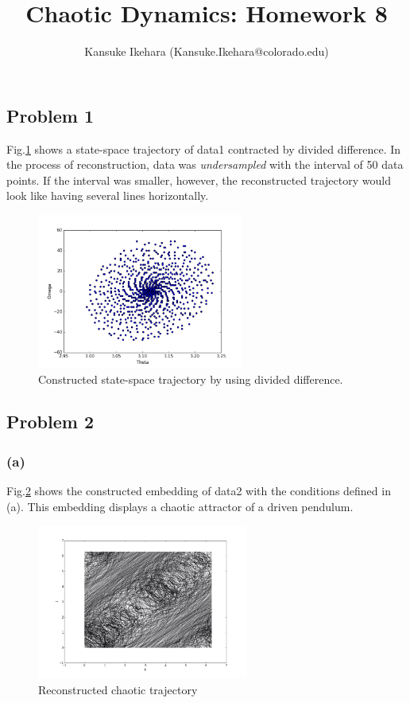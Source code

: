 \documentclass{article}
\title{Chaotic Dynamics: Homework 8}
\author{Kansuke Ikehara (Kansuke.Ikehara@colorado.edu)}
\begin{document}
\maketitle

\subsection*{Problem 1}
Fig.\ref{q1a} shows a state-space trajectory of data1 contracted by divided difference.  In the process of reconstruction, data was \textit{undersampled} with the interval of 50 data points. If the interval was smaller, however, the reconstructed trajectory would look like having several lines horizontally.
\begin{figure}[h]
  \centering
  \includegraphics[height=2in]{figs/q1_interval_50.png}
  \caption{Constructed state-space trajectory by using divided difference.}
  \label{q1a}
\end{figure}

\subsection*{Problem 2}
\subsubsection*{(a)}
Fig.\ref{q2a} shows the constructed embedding of data2 with the conditions defined in (a). This embedding displays a chaotic attractor of a driven pendulum. 
\begin{figure}[h]
  \centering
  \includegraphics[height=2in]{figs/q2a.png}
  \caption{Reconstructed chaotic trajectory}
  \label{q2a}
\end{figure}
\end{document}
